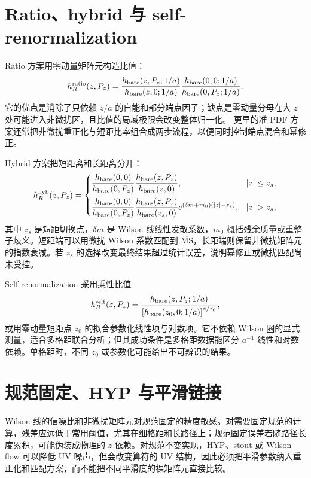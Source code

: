 \documentclass[UTF8,12pt,a4paper,twoside,openany]{ctexbook}
\newcommand{\MSbar}{\overline{\mathrm{MS}}}
\begin{document}
\section{Ratio、hybrid 与 self-renormalization}

Ratio 方案用零动量矩阵元构造比值：
\begin{equation}
  h_R^{\rm ratio}(z,P_z)
  =\frac{h_{\rm bare}(z,P_z;1/a)}
  {h_{\rm bare}(z,0;1/a)}
  \frac{h_{\rm bare}(0,0;1/a)}{h_{\rm bare}(0,P_z;1/a)} .
  \label{eq:ratiodetail}
\end{equation}
它的优点是消除了只依赖 \(z/a\) 的自能和部分端点因子；缺点是零动量分母在大 \(z\) 处可能进入非微扰区，且比值的局域极限会改变整体归一化。
更早的准 PDF 方案还常把非微扰重正化与短距比率组合成两步流程，以便同时控制端点混合和幂修正\cite{Alexandrou2017}。

Hybrid 方案把短距离和长距离分开：
\begin{equation}
  h_R^{\rm hyb}(z,P_z)=
  \begin{cases}
  \dfrac{h_{\rm bare}(0,0)}{h_{\rm bare}(0,P_z)}
  \dfrac{h_{\rm bare}(z,P_z)}{h_{\rm bare}(z,0)}, & |z|\le z_s,\\[1.0em]
  \dfrac{h_{\rm bare}(0,0)}{h_{\rm bare}(0,P_z)}
  \dfrac{h_{\rm bare}(z,P_z)}{h_{\rm bare}(z_s,0)}
  e^{(\delta m+m_0)(|z|-z_s)}, & |z|>z_s,
  \end{cases}
  \label{eq:hybriddetail}
\end{equation}
其中 \(z_s\) 是短距切换点，\(\delta m\) 是 Wilson 线线性发散系数，\(m_0\) 概括残余质量或重整子歧义。短距端可以用微扰 Wilson 系数匹配到 \(\MSbar\)，长距端则保留非微扰矩阵元的指数衰减。若 \(z_s\) 的选择改变最终结果超过统计误差，说明幂修正或微扰匹配尚未受控\cite{JiHybrid2021,GoodYaoLin2026}。

Self-renormalization 采用乘性比值
\begin{equation}
  h_R^{\rm self}(z,P_z)
  =\frac{h_{\rm bare}(z,P_z;1/a)}
  {\left[h_{\rm bare}(z_0,0;1/a)\right]^{z/z_0}},
  \label{eq:selfrenorm}
\end{equation}
或用零动量短距点 \(z_0\) 的拟合参数化线性项与对数项。它不依赖 Wilson 圈的显式测量，适合多格距联合分析；但其成功条件是多格距数据能区分 \(a^{-1}\) 线性和对数依赖。单格距时，不同 \(z_0\) 或参数化可能给出不可辨识的结果\cite{Huo2021}。

\section{规范固定、HYP 与平滑链接}

Wilson 线的信噪比和非微扰矩阵元对规范固定的精度敏感。对需要固定规范的计算，残差应远低于常用阈值，尤其在细格距和长路径上；规范固定误差若随路径长度累积，可能伪装成物理的 \(z\) 依赖。对规范不变实现，HYP、stout 或 Wilson flow 可以降低 UV 噪声，但会改变算符的 UV 结构，因此必须把平滑参数纳入重正化和匹配方案，而不能把不同平滑度的裸矩阵元直接比较\cite{ZhangGauge2024,Peardon2009,Bali2016}。
\end{document}
